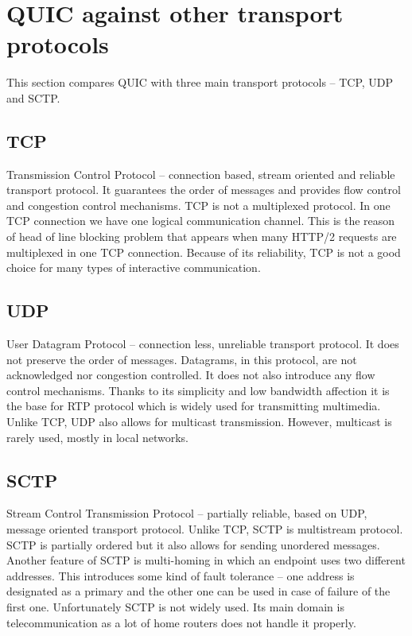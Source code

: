 \section{QUIC against other transport protocols}
\label{sec:quic_against_other_transport_protocols}
This section compares QUIC with three main transport protocols -- TCP, UDP and SCTP\@.

\subsection{TCP}
\label{subsec:tcp}
Transmission Control Protocol -- connection based, stream oriented and reliable transport protocol.
It guarantees the order of messages and provides flow control and congestion control mechanisms.
TCP is not a multiplexed protocol.
In one TCP connection we have one logical communication channel.
This is the reason of head of line blocking problem that appears when many HTTP/2 requests are multiplexed in one TCP connection.
Because of its reliability, TCP is not a good choice for many types of interactive communication.

\subsection{UDP}
\label{subsec:udp}
User Datagram Protocol -- connection less, unreliable transport protocol.
It does not preserve the order of messages.
Datagrams, in this protocol, are not acknowledged nor congestion controlled.
It does not also introduce any flow control mechanisms.
Thanks to its simplicity and low bandwidth affection it is the base for RTP protocol which is widely used for transmitting multimedia.
Unlike TCP, UDP also allows for multicast transmission.
However, multicast is rarely used, mostly in local networks.

\subsection{SCTP}
\label{subsec:sctp}
Stream Control Transmission Protocol -- partially reliable, based on UDP, message oriented transport protocol.
Unlike TCP, SCTP is multistream protocol.
SCTP is partially ordered but it also allows for sending unordered messages.
Another feature of SCTP is multi-homing in which an endpoint uses two different addresses.
This introduces some kind of fault tolerance -- one address is designated as a primary and the other one can be used in case of failure of the first one.
Unfortunately SCTP is not widely used.
Its main domain is telecommunication as a lot of home routers does not handle it properly.

